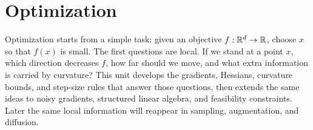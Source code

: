 \section{Optimization}
\label{sec:optimization}

Optimization starts from a simple task: given an objective \(f:\mathbb{R}^d\to\mathbb{R}\), choose \(x\) so that \(f(x)\) is small.
The first questions are local.
If we stand at a point \(x\), which direction decreases \(f\), how far should we move, and what extra information is carried by curvature?
This unit develops the gradients, Hessians, curvature bounds, and step-size rules that answer those questions, then extends the same ideas to noisy gradients, structured linear algebra, and feasibility constraints.
Later the same local information will reappear in sampling, augmentation, and diffusion.








